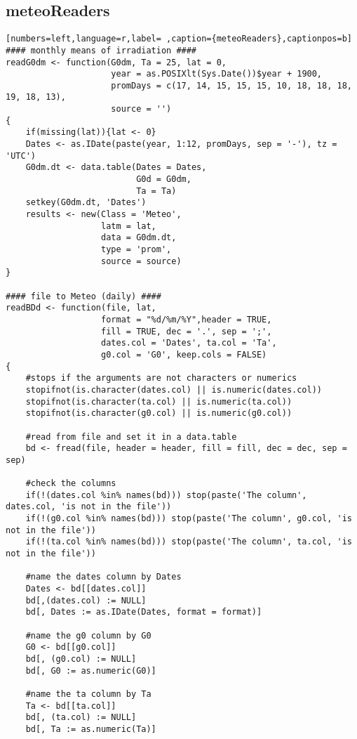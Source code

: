 \subsection{meteoReaders}
\label{sec:orgabe9b5b}
\begin{lstlisting}[numbers=left,language=r,label= ,caption={meteoReaders},captionpos=b]
#### monthly means of irradiation ####
readG0dm <- function(G0dm, Ta = 25, lat = 0,
                     year = as.POSIXlt(Sys.Date())$year + 1900,
                     promDays = c(17, 14, 15, 15, 15, 10, 18, 18, 18, 19, 18, 13),
                     source = '')
{
    if(missing(lat)){lat <- 0}
    Dates <- as.IDate(paste(year, 1:12, promDays, sep = '-'), tz = 'UTC')
    G0dm.dt <- data.table(Dates = Dates,
                          G0d = G0dm,
                          Ta = Ta)
    setkey(G0dm.dt, 'Dates')
    results <- new(Class = 'Meteo',
                   latm = lat,
                   data = G0dm.dt,
                   type = 'prom',
                   source = source)
}

#### file to Meteo (daily) ####
readBDd <- function(file, lat,
                   format = "%d/%m/%Y",header = TRUE,
                   fill = TRUE, dec = '.', sep = ';',
                   dates.col = 'Dates', ta.col = 'Ta',
                   g0.col = 'G0', keep.cols = FALSE)
{
    #stops if the arguments are not characters or numerics
    stopifnot(is.character(dates.col) || is.numeric(dates.col))
    stopifnot(is.character(ta.col) || is.numeric(ta.col))
    stopifnot(is.character(g0.col) || is.numeric(g0.col))

    #read from file and set it in a data.table
    bd <- fread(file, header = header, fill = fill, dec = dec, sep = sep)

    #check the columns
    if(!(dates.col %in% names(bd))) stop(paste('The column', dates.col, 'is not in the file'))
    if(!(g0.col %in% names(bd))) stop(paste('The column', g0.col, 'is not in the file'))
    if(!(ta.col %in% names(bd))) stop(paste('The column', ta.col, 'is not in the file'))

    #name the dates column by Dates
    Dates <- bd[[dates.col]]
    bd[,(dates.col) := NULL]
    bd[, Dates := as.IDate(Dates, format = format)]

    #name the g0 column by G0
    G0 <- bd[[g0.col]]
    bd[, (g0.col) := NULL]
    bd[, G0 := as.numeric(G0)]

    #name the ta column by Ta
    Ta <- bd[[ta.col]]
    bd[, (ta.col) := NULL]
    bd[, Ta := as.numeric(Ta)]


\end{lstlisting}
